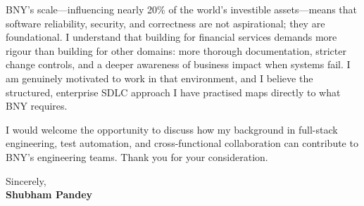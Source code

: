 \documentclass[a4paper,11pt]{article}
\begin{document}
\vspace{8pt}
BNY's scale---influencing nearly 20\% of the world's investible assets---means that software reliability, security, and correctness are not aspirational; they are foundational. I understand that building for financial services demands more rigour than building for other domains: more thorough documentation, stricter change controls, and a deeper awareness of business impact when systems fail. I am genuinely motivated to work in that environment, and I believe the structured, enterprise SDLC approach I have practised maps directly to what BNY requires.

\vspace{8pt}
I would welcome the opportunity to discuss how my background in full-stack engineering, test automation, and cross-functional collaboration can contribute to BNY's engineering teams. Thank you for your consideration.

\vspace{16pt}
Sincerely,\\[6pt]
\textbf{Shubham Pandey}
\end{document}
